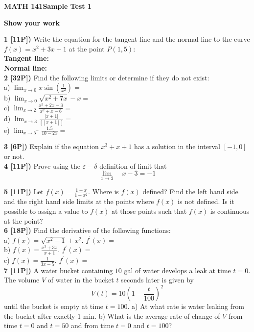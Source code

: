 \documentclass[12pt]{article}
\begin{document}

\centerline{\bf MATH 141\quad Sample Test 1}%
\centerline{\bf Show your work}

{\bf 1 [11P])}  Write the equation for the tangent line and the normal line
to the curve
$\displaystyle{f(x) = x^2+3x + 1}$ at the
point $\displaystyle{P(1,5)}$:
\\ %
{\bf Tangent line: }
\\ %
{\bf Normal line: }
\\ %
{\bf 2 [32P])}  Find the following limits or determine if they do not exist:
\\
a) $\displaystyle{\lim_{x\to 0}x\sin \left(\frac{1}{x^2}\right)=}$
\\ %
b) $\displaystyle{\lim_{x\to 0} \sqrt{x^2+7x}-x =}$
\\
c) $\displaystyle{\lim_{x\to 2}\frac{x^2+2x-3}{x^2+x-6}=}$
\\ %
d) $\displaystyle{\lim_{x\to 3}\frac{\vert x+1 \vert}{[[x+1]]}=}$
\\
e) $\displaystyle{\lim_{x\to 5^-}\frac{1.5}{10-2x}=}$ 

{\bf 3 [6P])}  Explain if the equation $\displaystyle{x^3+x + 1}$ has a solution in the
interval $[-1,0]$ or not.
\\ %
{\bf 4 [11P])} Prove using the $\varepsilon-\delta$ definition of limit
that
$$
\lim_{x\rightarrow 2}\quad x-3 =-1
$$


{\bf 5 [11P])}  Let $\displaystyle{f(x) = \frac{1-x}{1-x^2}}$. Where
is $f(x)$ defined?  Find the left hand side and the right hand side limits at the
points where $f(x)$ is not defined. Is it possible to assign a value to $f(x)$ at
those points such that $f(x)$ is continuous at the point?
\\ %
{\bf 6 [18P])} Find the derivative of the following functions:
\\ %
a) $\displaystyle{f(x) = \sqrt{x^2-1} + x^2} $. $\displaystyle{f^\prime(x) = }$
\\ %
b) $\displaystyle{f(x) = \frac{x^3 + 3x}{x+1}}$.
$\displaystyle{f^\prime(x) = }$
\\ %
c) $\displaystyle{f(x) = \frac{1}{3x-5}}$. $\displaystyle{f^\prime(x) = }$
\\ %
{\bf 7 [11P])} A water bucket containing $10$ gal of water
develops a leak at time
$t=0$. The volume $V$ of water
in the bucket $t$ seconds later is given by
\[ V(t) = 10\left(1 - \frac{t}{100}\right)^2\]
until the bucket is empty at time $t=100$.
a) At what rate is water leaking from the bucket after
exactly $1$ min.
b) What is the average rate of change of $V$ from time $t=0$
and $t=50$ and from time $t=0$ and $t=100$?
\end{document}
